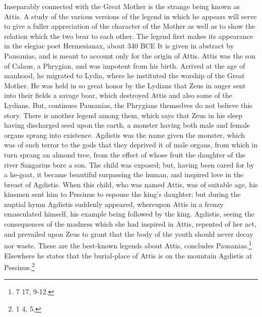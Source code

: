 \documentclass[a4paper, 11pt, oneside, polutonikogreek, english]{article}
\begin{document}
Inseparably connected with the Great Mother is the strange being known as Attis. A study of the various versions of the legend in which he appears will serve to give a fuller appreciation of the character of the Mother as well as to show the relation which the two bear to each other. The legend first makes its appearance in the elegiac poet Hermesianax, about 340 \textsc{BCE} It is given in abstract by Pausanias, and is meant to account only for the origin of Attis. Attis was the son of Calaus, a Phrygian, and was impotent from his birth. Arrived at the age of manhood, he migrated to Lydia, where he instituted the worship of the Great Mother. He was held in so great honor by the Lydians that Zeus in anger sent into their fields a savage boar, which destroyed Attis and also some of the Lydians. But, continues Pausanias, the Phrygians themselves do not believe this story. There is another legend among them, which says that Zeus in his sleep having discharged seed upon the earth, a monster having both male and female organs sprang into existence. Agdistis was the name given the monster, which was of such terror to the gods that they deprived it of male organs, from which in turn sprang an almond tree, from the effect of whose fruit the daughter of the river Sangarius bore a son. The child was exposed; but, having been cared for by a he-goat, it became beautiful surpassing the human, and inspired love in the breast of Agdistis. When this child, who was named Attis, was of suitable age, his kinsmen sent him to Pessinus to espouse the king's daughter; but during the nuptial hymn Agdistis suddenly appeared, whereupon Attis in a frenzy emasculated himself, his example being followed by the king. Agdistis, seeing the consequences of the madness which she had inspired in Attis, repented of her act, and prevailed upon Zeus to grant that the body of the youth should never decay nor waste. These are the best-known legends about Attis, concludes Pausanias.\footnote{7 17, 9-12.} Elsewhere he states that the burial-place of Attis is on the mountain Agdistis at Pessinus.\footnote{1 4, 5.}
\end{document}

